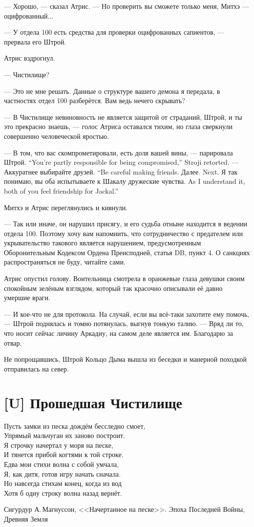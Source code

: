 --- Хорошо, --- сказал Атрис.
--- Но проверить вы сможете только меня, Митхэ --- оцифрованный...

--- У отдела 100 есть средства для проверки оцифрованных сапиентов, --- прервала его Штрой.

Атрис вздрогнул.

--- Чистилище?

--- Это не мне решать.
Данные о структуре вашего демона я передала, в частностях отдел 100 разберётся.
Вам ведь нечего скрывать?

--- В Чистилище невиновность не является защитой от страданий, Штрой, и ты это прекрасно знаешь, --- голос Атриса оставался тихим, но глаза сверкнули совершенно человеческой яростью.

{--- В том, что вас скомпрометировали, есть доля вашей вины, --- парировала Штрой.}
{``You're partly responsible for being compromised,'' Stroji retorted.}
{--- Аккуратнее выбирайте друзей.}
{``Be careful making friends.}
{Далее.}
{Next.}
{Я так понимаю, вы оба испытываете к Шакалу дружеские чувства.}
{As I understand it, both of you feel friendship for Jackal.''}

Митхэ и Атрис переглянулись и кивнули.

--- Так или иначе, он нарушил присягу, и его судьба отныне находится в ведении отдела 100.
Поэтому хочу вам напомнить, что сотрудничество с предателем или укрывательство такового является нарушением, предусмотренным Оборонительным Кодексом Ордена Преисподней, статья DB, пункт 4.
О санкциях распространяться не буду, читайте сами.

Атрис опустил голову.
Воительница смотрела в оранжевые глаза девушки своим спокойным зелёным взглядом, который так красочно описывали её давно умершие враги.

--- И кое-что не для протокола.
На случай, если вы всё-таки захотите ему помочь, --- Штрой поднялась и томно потянулась, выгнув тонкую талию.
--- Вряд ли то, что носит сейчас личину Аркадиу, на самом деле является им.
Благодарю за отвар.

Не попрощавшись, Штрой Кольцо Дыма вышла из беседки и манерной походкой отправилась на север.

\section{[U] Прошедшая Чистилище}

\epigraph
{Пусть замки из песка дождём бесследно смоет,\\
Упрямый мальчуган их заново построит.\\
Я строчку начертал у моря на песке,\\
И тянется прибой когтями к той строке.\\
Едва мои стихи волна с собой умчала,\\
Я, как дитя, готов игру начать сначала.\\
Но навсегда стихам конец, когда из вод\\
Хотя б одну строку волна назад вернёт.}
{Сигурдур А.\,Магнуссон, <<Начертанное на песке>>.
Эпоха Последней Войны, Древняя Земля}

